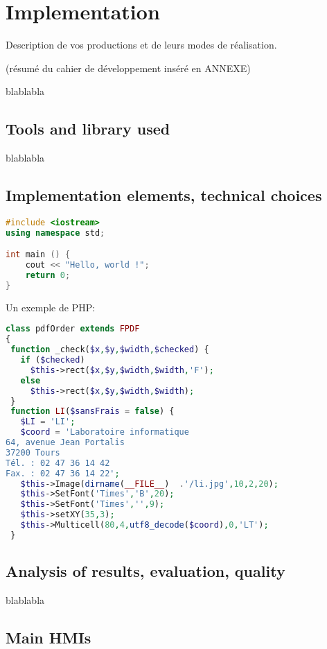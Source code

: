 \documentclass{polytech/polytech}
\numberwithin{figure}{chapter}
\begin{document}
\chapter{Implementation}

Description de vos productions et de leurs modes de réalisation.

(résumé du cahier de développement inséré en ANNEXE)

blablabla

\section{Tools and library used}

blablabla

\section{Implementation elements, technical choices}

\begin{lstlisting}[language=C++]
#include <iostream>
using namespace std;

int main () {
    cout << "Hello, world !";
    return 0;
}
\end{lstlisting}

Un exemple de PHP:
\begin{lstlisting}[language=php]
class pdfOrder extends FPDF
{
 function _check($x,$y,$width,$checked) {
   if ($checked)
     $this->rect($x,$y,$width,$width,'F');
   else
     $this->rect($x,$y,$width,$width);
 }
 function LI($sansFrais = false) {
   $LI = 'LI';
   $coord = 'Laboratoire informatique
64, avenue Jean Portalis
37200 Tours
Tél. : 02 47 36 14 42
Fax. : 02 47 36 14 22';
   $this->Image(dirname(__FILE__)  .'/li.jpg',10,2,20);
   $this->SetFont('Times','B',20);
   $this->SetFont('Times','',9);
   $this->setXY(35,3);
   $this->Multicell(80,4,utf8_decode($coord),0,'LT');
 }
\end{lstlisting}

\section{Analysis of results, evaluation, quality}

blablabla


\section{Main HMIs}
\end{document}
